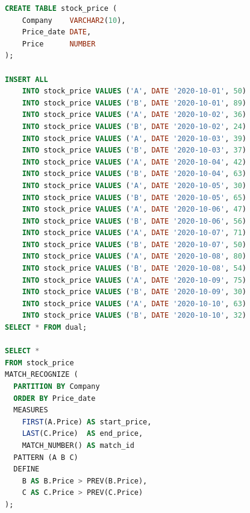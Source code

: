 \begin{lstlisting}[float=htbp,language=SQL,
  caption={[Oracle SQL for the stock-price pattern]Oracle SQL: the same
    clause as Listing~\ref{lst:stock-trino} over an Oracle copy of the
    \texttt{stock\_price} table.},
  label={lst:stock-oracle}]
CREATE TABLE stock_price (
    Company    VARCHAR2(10),
    Price_date DATE,
    Price      NUMBER
);

INSERT ALL
    INTO stock_price VALUES ('A', DATE '2020-10-01', 50)
    INTO stock_price VALUES ('B', DATE '2020-10-01', 89)
    INTO stock_price VALUES ('A', DATE '2020-10-02', 36)
    INTO stock_price VALUES ('B', DATE '2020-10-02', 24)
    INTO stock_price VALUES ('A', DATE '2020-10-03', 39)
    INTO stock_price VALUES ('B', DATE '2020-10-03', 37)
    INTO stock_price VALUES ('A', DATE '2020-10-04', 42)
    INTO stock_price VALUES ('B', DATE '2020-10-04', 63)
    INTO stock_price VALUES ('A', DATE '2020-10-05', 30)
    INTO stock_price VALUES ('B', DATE '2020-10-05', 65)
    INTO stock_price VALUES ('A', DATE '2020-10-06', 47)
    INTO stock_price VALUES ('B', DATE '2020-10-06', 56)
    INTO stock_price VALUES ('A', DATE '2020-10-07', 71)
    INTO stock_price VALUES ('B', DATE '2020-10-07', 50)
    INTO stock_price VALUES ('A', DATE '2020-10-08', 80)
    INTO stock_price VALUES ('B', DATE '2020-10-08', 54)
    INTO stock_price VALUES ('A', DATE '2020-10-09', 75)
    INTO stock_price VALUES ('B', DATE '2020-10-09', 30)
    INTO stock_price VALUES ('A', DATE '2020-10-10', 63)
    INTO stock_price VALUES ('B', DATE '2020-10-10', 32)
SELECT * FROM dual;

SELECT *
FROM stock_price
MATCH_RECOGNIZE (
  PARTITION BY Company
  ORDER BY Price_date
  MEASURES
    FIRST(A.Price) AS start_price,
    LAST(C.Price)  AS end_price,
    MATCH_NUMBER() AS match_id
  PATTERN (A B C)
  DEFINE
    B AS B.Price > PREV(B.Price),
    C AS C.Price > PREV(C.Price)
);
\end{lstlisting}


